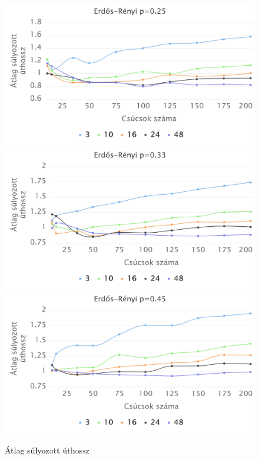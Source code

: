 \documentclass[12pt]{report}
\begin{document}
\begin{figure}[h]
	\begin{center}
		\includegraphics[width=0.49\linewidth]{pictures/constant_dan_ratio25_avg_route_len.png}
		\includegraphics[width=0.49\linewidth]{pictures/constant_dan_ratio33_avg_route_len.png}
		\includegraphics[width=0.49\linewidth]{pictures/constant_dan_ratio45_avg_route_len.png}
		\caption{Átlag súlyozott úthossz}
	\end{center}
\end{figure}
\end{document}
